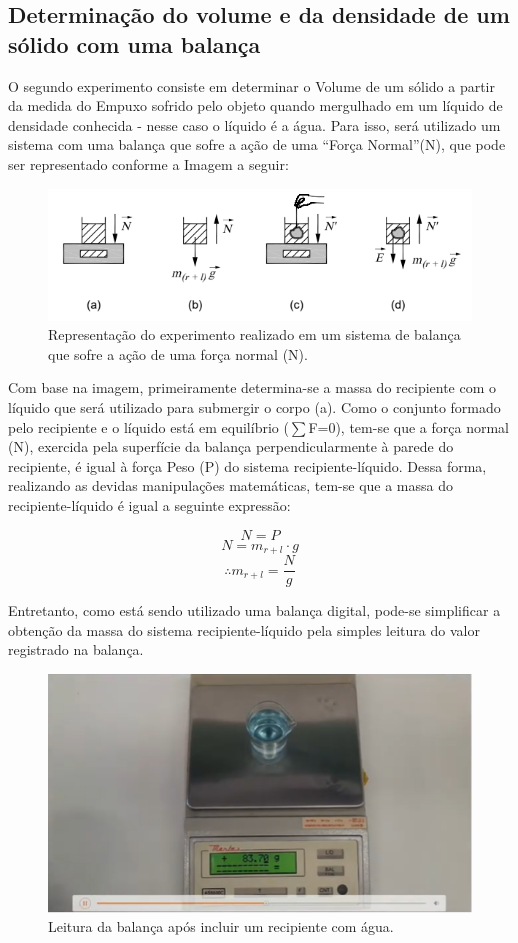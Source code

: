 \subsection{Determinação do volume e da densidade de um sólido com
uma balança}

O segundo experimento consiste em determinar o Volume de um sólido a partir da medida do Empuxo sofrido pelo objeto quando mergulhado em um líquido de densidade conhecida - nesse caso o líquido é a água. Para isso, será utilizado um sistema com uma balança que sofre a ação de uma “Força Normal”(N), que pode ser representado conforme a Imagem a seguir:

\begin{figure}[H]
    \centering
    \includegraphics[scale=0.8]{images/Experimento2.png}
    \caption{Representação do experimento realizado em um sistema de balança que sofre a ação de uma força normal (N).}
\end{figure}

Com base na imagem, primeiramente determina-se a massa do recipiente com o líquido que será utilizado para submergir o corpo (a). Como o conjunto formado pelo recipiente e o líquido está em equilíbrio ($\sum$F=0), tem-se que a força normal (N), exercida pela superfície da balança perpendicularmente à parede do recipiente, é igual à força Peso (P) do sistema recipiente-líquido. Dessa forma, realizando as devidas manipulações matemáticas, tem-se que a massa do recipiente-líquido é igual a seguinte expressão:

\[ N = P \]
\[ N = m_{r+l} \cdot g \]
\[\therefore m_{r+l} = \frac{N}{g} \]

Entretanto, como está sendo utilizado uma balança digital, pode-se simplificar a obtenção da massa do sistema recipiente-líquido pela simples leitura do valor registrado na balança.

\begin{figure}[H]
    \centering
    \includegraphics[scale=0.8]{images/Experimento2.2.png}
    \caption{Leitura da balança após incluir um recipiente com água.}
\end{figure}

